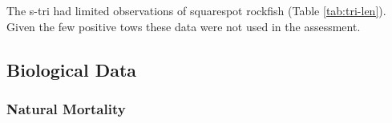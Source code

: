 \documentclass[11pt,
  english,
  a4paper,
]{article}
\begin{document}
The \Gls{s-tri} had limited observations of squarespot rockfish (Table \ref{tab:tri-len}). Given the few positive tows these data were not used in the assessment.

\leavevmode\tagmcend\tagstructend\par


\hypertarget{biological-data}{%
\subsection{Biological Data}\label{biological-data}}

\leavevmode\tagmcend\tagstructend


\hypertarget{natural-mortality}{%
\subsubsection{Natural Mortality}\label{natural-mortality}}

\leavevmode\tagmcend\tagstructend

\end{document}
